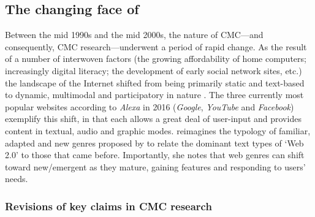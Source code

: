\subsection{The changing face of }

Between the mid 1990s and the mid 2000s, the nature of \gls{CMC}---and consequently, \gls{CMC} research---underwent a period of rapid change. As the result of a number of interwoven factors (the growing affordability of home computers; increasingly digital literacy; the development of early social network sites, etc.) the landscape of the Internet shifted from being primarily static and text\hyp{}based to dynamic, multimodal and participatory in nature \cite{herring_discourse_2011,lindholm_identity_2012}. The three currently most popular websites according to \emph{Alexa} in 2016 (\emph{Google}, \emph{YouTube} and \emph{Facebook}) exemplify this shift, in that each allows a great deal of user\hyp{}input and provides content in textual, audio and graphic modes. \textcite{herring_discourse_2011} reimagines the typology of familiar, adapted and new genres proposed by \textcite{crowston_reproduced_2000} to relate the dominant text types of `Web 2.0' to those that came before. Importantly, she notes that web genres can shift toward new\slash emergent as they mature, gaining features and responding to users' needs.

\subsubsection{Revisions of key claims in CMC research}

